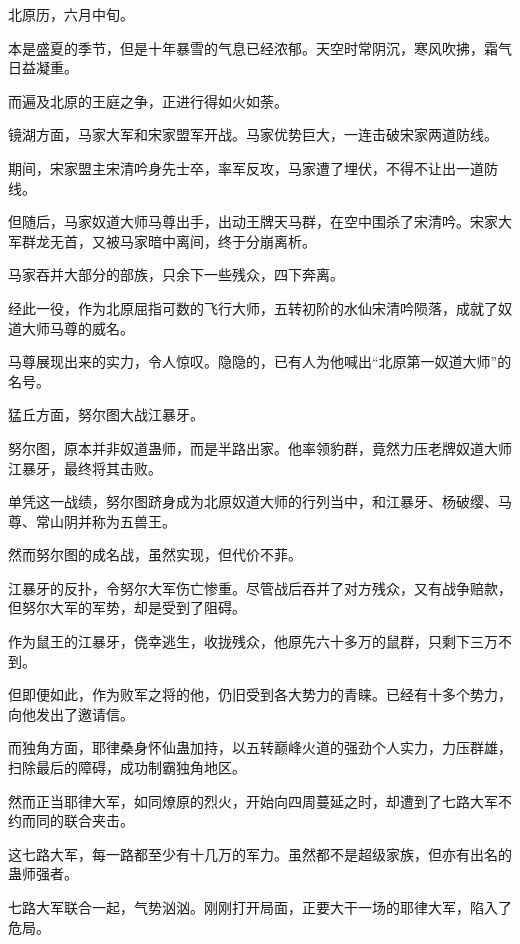 
\begin{this_body}



北原历，六月中旬。

本是盛夏的季节，但是十年暴雪的气息已经浓郁。天空时常阴沉，寒风吹拂，霜气日益凝重。

而遍及北原的王庭之争，正进行得如火如荼。

镜湖方面，马家大军和宋家盟军开战。马家优势巨大，一连击破宋家两道防线。

期间，宋家盟主宋清吟身先士卒，率军反攻，马家遭了埋伏，不得不让出一道防线。

但随后，马家奴道大师马尊出手，出动王牌天马群，在空中围杀了宋清吟。宋家大军群龙无首，又被马家暗中离间，终于分崩离析。

马家吞并大部分的部族，只余下一些残众，四下奔离。

经此一役，作为北原屈指可数的飞行大师，五转初阶的水仙宋清吟陨落，成就了奴道大师马尊的威名。

马尊展现出来的实力，令人惊叹。隐隐的，已有人为他喊出“北原第一奴道大师”的名号。

猛丘方面，努尔图大战江暴牙。

努尔图，原本并非奴道蛊师，而是半路出家。他率领豹群，竟然力压老牌奴道大师江暴牙，最终将其击败。

单凭这一战绩，努尔图跻身成为北原奴道大师的行列当中，和江暴牙、杨破缨、马尊、常山阴并称为五兽王。

然而努尔图的成名战，虽然实现，但代价不菲。

江暴牙的反扑，令努尔大军伤亡惨重。尽管战后吞并了对方残众，又有战争赔款，但努尔大军的军势，却是受到了阻碍。

作为鼠王的江暴牙，侥幸逃生，收拢残众，他原先六十多万的鼠群，只剩下三万不到。

但即便如此，作为败军之将的他，仍旧受到各大势力的青睐。已经有十多个势力，向他发出了邀请信。

而独角方面，耶律桑身怀仙蛊加持，以五转巅峰火道的强劲个人实力，力压群雄，扫除最后的障碍，成功制霸独角地区。

然而正当耶律大军，如同燎原的烈火，开始向四周蔓延之时，却遭到了七路大军不约而同的联合夹击。

这七路大军，每一路都至少有十几万的军力。虽然都不是超级家族，但亦有出名的蛊师强者。

七路大军联合一起，气势汹汹。刚刚打开局面，正要大干一场的耶律大军，陷入了危局。


\end{this_body}
